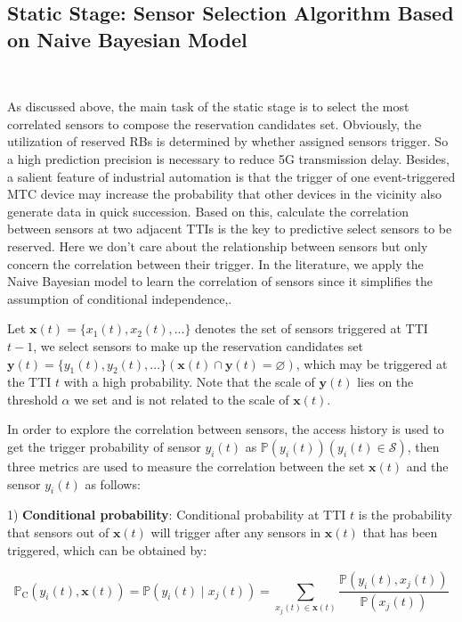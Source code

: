 \documentclass{SCIS2021}
\begin{document}
	
	\subsection{Static Stage: Sensor Selection Algorithm Based on Naive Bayesian Model}~{}
	\label{sec:selection}
	\par As discussed above, the main task of the static stage is to select the most correlated sensors to compose the reservation candidates set. Obviously, the utilization of reserved RBs is determined by whether assigned sensors trigger. So a high prediction precision is necessary to reduce 5G transmission delay. Besides, a salient feature of industrial automation is that the trigger of one event-triggered MTC device may increase the probability that other devices in the vicinity also generate data in quick succession\cite{shafiq2013large,li2018predictive}. Based on this, calculate the correlation between sensors at two adjacent TTIs is the key to predictive select sensors to be reserved. Here we don't care about the relationship between sensors but only concern the correlation between their trigger. In the literature\cite{li2018predictive}, we apply the Naive Bayesian model to learn the correlation of sensors since it simplifies the assumption of conditional independence,.
	
	
	\par Let $\bm{x}(t)=\{x_{1}(t), x_{2}(t), ...\}$ denotes the set of sensors triggered at TTI $t-1$, we select sensors to make up the reservation candidates set $\bm{y}(t) = \{y_{1}(t), y_{2}(t), ...\}(\bm{x}(t) \cap \bm{y}(t) = \varnothing)$, which may be triggered at the TTI $t$ with a high probability. Note that the scale of $\bm{y}(t)$ lies on the threshold $\alpha$ we set and is not related to the scale of $\bm{x}(t)$.
	
	\par In order to explore the correlation between sensors, the access history is used to get the trigger probability of sensor $y_{i}(t)$ as $\bm{\mathbb{P}}(y_{i}(t)) (y_{i}(t) \in \mathcal{S})$, then three metrics are used to measure the correlation between the set $\bm{x}(t)$ and the sensor $y_{i}(t)$ as follows\cite{sanasam2010feature}:
	
	\par 1) \textbf{Conditional probability}: Conditional probability at TTI $t$ is the probability that sensors out of $\bm{x}(t)$ will trigger after any sensors in $\bm{x}(t)$ that has been triggered, which can be obtained by:
	
	\setlength\abovedisplayskip{-15pt}
	\begin{center}
		\begin{equation}
			\mathbb{P}_{\mathrm{C}}(y_{i}(t),  \bm{x}(t))= \mathbb{P}(y_{i}(t) \mid x_{j}(t))= \sum_{x_{j}(t)\in \bm{x}(t)} \frac{\mathbb{P}(y_{i}(t), x_{j}(t))}{\mathbb{P}(x_{j}(t))}
		\end{equation}
	\end{center}
	\setlength\belowdisplayskip{-8pt}
	
\end{document}
